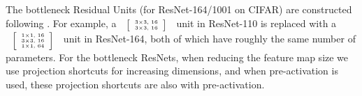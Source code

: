 \documentclass[runningheads]{llncs}
\begin{document}
The bottleneck Residual Units (for ResNet-164/1001 on CIFAR) are constructed following \cite{He2016}. For example, a $\blocka{16}$ unit in ResNet-110 is replaced with a $\blockb{64}{16}$ unit in ResNet-164, both of which have roughly the same number of parameters. For the bottleneck ResNets, when reducing the feature map size we use projection shortcuts \cite{He2016} for increasing dimensions, and when pre-activation is used, these projection shortcuts are also with pre-activation.



\end{document}
